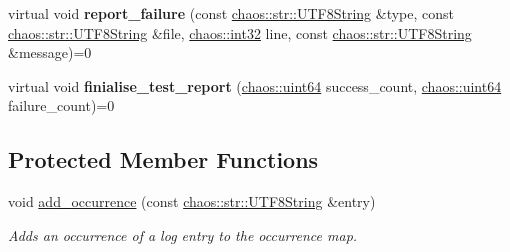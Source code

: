 \begin{DoxyCompactItemize}
\item 
\hypertarget{classchaos_1_1test_1_1log__formatter_1_1_abstract_test_log_formatter_ac262617f960d1f2ccc5834609f56a155}{virtual void {\bfseries report\-\_\-failure} (const \hyperlink{classchaos_1_1str_1_1_u_t_f8_string}{chaos\-::str\-::\-U\-T\-F8\-String} \&type, const \hyperlink{classchaos_1_1str_1_1_u_t_f8_string}{chaos\-::str\-::\-U\-T\-F8\-String} \&file, \hyperlink{namespacechaos_ad1de7efb430365afd2c9446a0f522a90}{chaos\-::int32} line, const \hyperlink{classchaos_1_1str_1_1_u_t_f8_string}{chaos\-::str\-::\-U\-T\-F8\-String} \&message)=0}\label{classchaos_1_1test_1_1log__formatter_1_1_abstract_test_log_formatter_ac262617f960d1f2ccc5834609f56a155}

\item 
\hypertarget{classchaos_1_1test_1_1log__formatter_1_1_abstract_test_log_formatter_abf38873184b3f0db330a918f4ec08d4b}{virtual void {\bfseries finialise\-\_\-test\-\_\-report} (\hyperlink{namespacechaos_a34fe5f5bfc3ef6d80b5d094ed91b4d6e}{chaos\-::uint64} success\-\_\-count, \hyperlink{namespacechaos_a34fe5f5bfc3ef6d80b5d094ed91b4d6e}{chaos\-::uint64} failure\-\_\-count)=0}\label{classchaos_1_1test_1_1log__formatter_1_1_abstract_test_log_formatter_abf38873184b3f0db330a918f4ec08d4b}

\end{DoxyCompactItemize}
\subsection*{Protected Member Functions}
\begin{DoxyCompactItemize}
\item 
\hypertarget{classchaos_1_1test_1_1log__formatter_1_1_abstract_test_log_formatter_a6a3ed5f138284b793e0b6a0783ac738b}{void \hyperlink{classchaos_1_1test_1_1log__formatter_1_1_abstract_test_log_formatter_a6a3ed5f138284b793e0b6a0783ac738b}{add\-\_\-occurrence} (const \hyperlink{classchaos_1_1str_1_1_u_t_f8_string}{chaos\-::str\-::\-U\-T\-F8\-String} \&entry)}\label{classchaos_1_1test_1_1log__formatter_1_1_abstract_test_log_formatter_a6a3ed5f138284b793e0b6a0783ac738b}

\begin{DoxyCompactList}\small\item\em Adds an occurrence of a log entry to the occurrence map. \end{DoxyCompactList}\end{DoxyCompactItemize}
